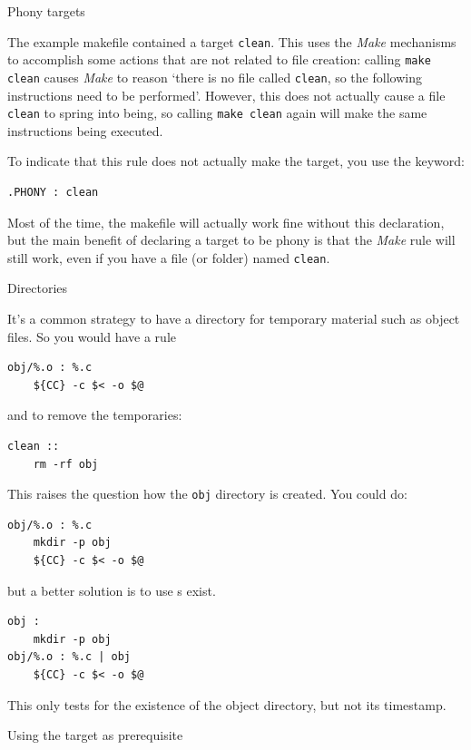  {Phony targets}

The example makefile contained a target \lstinline{clean}. This uses
the \emph{Make} mechanisms to accomplish some actions that are not
related to file creation: calling \lstinline{make clean} causes \emph{Make} to
reason `there is no file called \lstinline{clean}, so the following
instructions need to be performed'. However, this does not actually
cause a file \lstinline{clean} to spring into being, so calling \lstinline{make clean}
again will make the same instructions being executed.

To indicate that this rule does not actually make the target, you use
the  keyword:
\begin{lstlisting}
.PHONY : clean
\end{lstlisting}
Most of the time, the makefile will actually work fine without this
declaration, but the main benefit of declaring a target to be phony is
that the \emph{Make} rule will still work, even if you have a file (or folder)
named \lstinline{clean}.

 {Directories}

It's a common strategy to have a directory for temporary material
such as object files. So you would have a rule
\begin{lstlisting}
obj/%.o : %.c
    ${CC} -c $< -o $@
\end{lstlisting}
and to remove the temporaries:
\begin{lstlisting}
clean ::
    rm -rf obj
\end{lstlisting}
This raises the question how the \lstinline{obj} directory is created.
You could do:
\begin{lstlisting}
obj/%.o : %.c
    mkdir -p obj
    ${CC} -c $< -o $@
\end{lstlisting}
but a better solution is to use
s exist.
\begin{lstlisting}
obj :
    mkdir -p obj
obj/%.o : %.c | obj
    ${CC} -c $< -o $@
\end{lstlisting}
This only tests for the existence of the object directory,
but not its timestamp.

 {Using the target as prerequisite}

